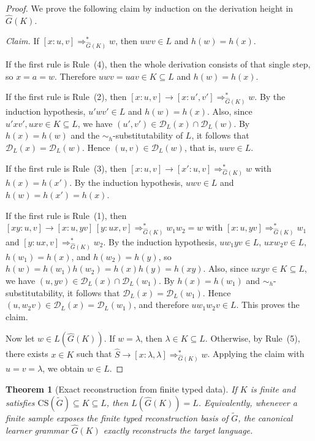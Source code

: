 \documentclass[11pt,a4paper]{article}
\newtheorem{theorem}{Theorem}[section]
\newcommand{\D}{\mathcal{D}}
\newcommand{\CS}{\mathrm{CS}}
\begin{document}
\begin{proof}
We prove the following claim by induction on the derivation height in $\hat G(K)$.

\smallskip\noindent\emph{Claim.} If $[x:u,v]\Rightarrow_{\hat G(K)}^* w$, then $uwv\in L$ and $h(w)=h(x)$.

\smallskip If the first rule is Rule~\textup{(4)}, then the whole derivation consists of that single step, so $x=a=w$. Therefore $uwv=uav\in K\subseteq L$ and $h(w)=h(x)$.

If the first rule is Rule~\textup{(2)}, then
$[x:u,v]\to[x:u',v']\Rightarrow_{\hat G(K)}^* w$.
By the induction hypothesis, $u'wv'\in L$ and $h(w)=h(x)$.
Also, since $u'xv',uxv\in K\subseteq L$, we have $(u',v')\in\D_L(x)\cap\D_L(w)$.
By $h(x)=h(w)$ and the $\sim_h$-substitutability of $L$, it follows that $\D_L(x)=\D_L(w)$.
Hence $(u,v)\in\D_L(w)$, that is, $uwv\in L$.

If the first rule is Rule~\textup{(3)}, then
$[x:u,v]\to[x':u,v]\Rightarrow_{\hat G(K)}^* w$
with $h(x)=h(x')$.
By the induction hypothesis, $uwv\in L$ and $h(w)=h(x')=h(x)$.

If the first rule is Rule~\textup{(1)}, then
$[xy:u,v]\to[x:u,yv]\,[y:ux,v]\Rightarrow_{\hat G(K)}^* w_1w_2=w$
with
$[x:u,yv]\Rightarrow_{\hat G(K)}^* w_1$
and
$[y:ux,v]\Rightarrow_{\hat G(K)}^* w_2$.
By the induction hypothesis,
$uw_1yv\in L$,
$uxw_2v\in L$,
$h(w_1)=h(x)$,
and
$h(w_2)=h(y)$,
so
$h(w)=h(w_1)h(w_2)=h(x)h(y)=h(xy)$.
Also, since $uxyv\in K\subseteq L$, we have $(u,yv)\in\D_L(x)\cap\D_L(w_1)$.
By $h(x)=h(w_1)$ and $\sim_h$-substitutability, it follows that $\D_L(x)=\D_L(w_1)$.
Hence $(u,w_2v)\in\D_L(x)=\D_L(w_1)$, and therefore $uw_1w_2v\in L$.
This proves the claim.

Now let $w\in L(\hat G(K))$. If $w=\lambda$, then $\lambda\in K\subseteq L$. Otherwise, by Rule~\textup{(5)}, there exists $x\in K$ such that
$\hat S\to[x:\lambda,\lambda]\Rightarrow_{\hat G(K)}^* w$.
Applying the claim with $u=v=\lambda$, we obtain $w\in L$.
\end{proof}

\begin{theorem}[Exact reconstruction from finite typed data]
\label{thm:reconstruction-fixed-h}
If $K$ is finite and satisfies $\CS(\widetilde G)\subseteq K\subseteq L$, then $L(\hat G(K))=L$. Equivalently, whenever a finite sample exposes the finite typed reconstruction basis of $\widetilde G$, the canonical learner grammar $\hat G(K)$ exactly reconstructs the target language.
\end{theorem}
\end{document}
